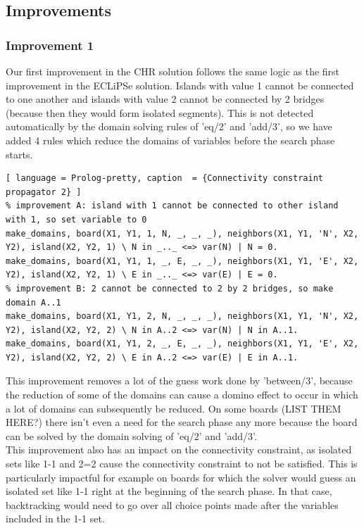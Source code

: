 \documentclass{report}
\begin{document}
\subsection{Improvements}
\subsubsection{Improvement 1}
Our first improvement in the CHR solution follows the same logic as the first improvement in the ECLiPSe solution. Islands with value 1 cannot be connected to one another and islands with value 2 cannot be connected by 2 bridges (because then they would form isolated segments). This is not detected automatically by the domain solving rules of 'eq/2' and 'add/3', so we have added 4 rules which reduce the domains of variables before the search phase starts. 

\begin{lstlisting}[ language = Prolog-pretty, caption  = {Connectivity constraint propagator 2} ]
% improvement A: island with 1 cannot be connected to other island with 1, so set variable to 0
make_domains, board(X1, Y1, 1, N, _, _, _), neighbors(X1, Y1, 'N', X2, Y2), island(X2, Y2, 1) \ N in _.._ <=> var(N) | N = 0.
make_domains, board(X1, Y1, 1, _, E, _, _), neighbors(X1, Y1, 'E', X2, Y2), island(X2, Y2, 1) \ E in _.._ <=> var(E) | E = 0.
% improvement B: 2 cannot be connected to 2 by 2 bridges, so make domain A..1
make_domains, board(X1, Y1, 2, N, _, _, _), neighbors(X1, Y1, 'N', X2, Y2), island(X2, Y2, 2) \ N in A..2 <=> var(N) | N in A..1.
make_domains, board(X1, Y1, 2, _, E, _, _), neighbors(X1, Y1, 'E', X2, Y2), island(X2, Y2, 2) \ E in A..2 <=> var(E) | E in A..1.
\end{lstlisting}

This improvement removes a lot of the guess work done by 'between/3', because the reduction of some of the domains can cause a domino effect to occur in which a lot of domains can subsequently be reduced. On some boards (LIST THEM HERE?) there isn't even a need for the search phase any more because the board can be solved by the domain solving of 'eq/2' and 'add/3'. \\
This improvement also has an impact on the connectivity constraint, as isolated sets like 1-1 and 2=2 cause the connectivity constraint to not be satisfied. This is particularly impactful for example on boards for which the solver would guess an isolated set like 1-1 right at the beginning of the search phase. In that case, backtracking would need to go over all choice points made after the variables included in the 1-1 set.
\end{document}
